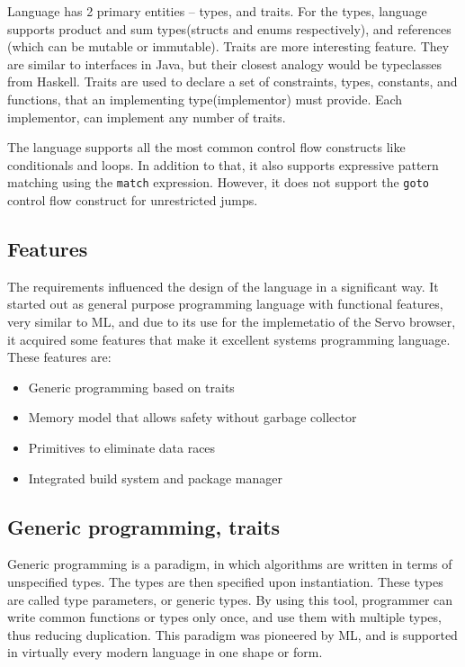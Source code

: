 Language has 2 primary entities -- types, and traits.
For the types, language supports product and sum types(structs and enums respectively), and references (which can be mutable or immutable).
Traits are more interesting feature. They are similar to interfaces in Java, but their closest analogy would be typeclasses from Haskell.
Traits are used to declare a set of constraints, types, constants, and functions, that an implementing type(implementor) must provide.
Each implementor, can implement any number of traits.

The language supports all the most common control flow constructs like conditionals and loops. In addition to that, it
also supports expressive pattern matching using the \verb|match| expression. However, it does not support the
\verb|goto| control flow construct for unrestricted jumps.

\subsection{Features}
The requirements influenced the design of the language in a significant way. It started out as general purpose programming
language with functional features, very similar to ML, and due to its use for the implemetatio of the Servo browser, it acquired some features that make it excellent
systems programming language. These features are:

\begin{itemize}
    \item Generic programming based on traits
    \item Memory model that allows safety without garbage collector
    \item Primitives to eliminate data races
    \item Integrated build system and package manager
\end{itemize}

\subsection{Generic programming, traits}
Generic programming is a paradigm, in which algorithms are written in terms of unspecified types.
The types are then specified upon instantiation. These types are called type parameters, or generic types.
By using this tool, programmer can write common functions or types only once, and use them with multiple
types, thus reducing duplication. This paradigm was pioneered by ML, and is supported in virtually every
modern language in one shape or form.

